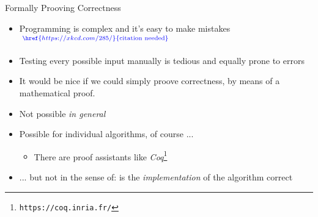 
\begin{frame}[fragile]{Formally Prooving Correctness}
%
\begin{itemize}
\item Programming is complex and it's easy to make mistakes$\phantom{.}^{\color{blue}\href{https://xkcd.com/285/}{\text{citation needed}}}$
\item Testing every possible input manually is tedious and equally prone to errors
\item[\Thus] It would be nice if we could simply proove correctness, \zB by means of a mathematical proof.
\pause
\item Not possible \emph{in general}
\item Possible for individual algorithms, of course ...
	\begin{itemize}
	\item There are proof assistants like \emph{Coq}\footnote{\texttt{https://coq.inria.fr/}}
	\end{itemize}
\item ... but not in the sense of: is the \emph{implementation} of the algorithm correct
\end{itemize}
%
\end{frame}



